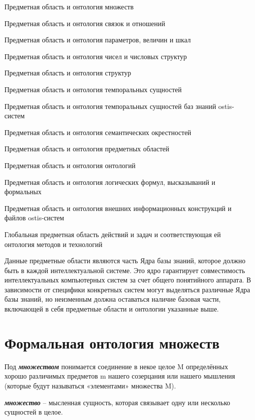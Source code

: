 \begin{textitemize}
\item Предметная область и онтология множеств
\item Предметная область и онтология связок и отношений
\item Предметная область и онтология параметров, величин и шкал
\item Предметная область и онтология чисел и числовых структур
\item Предметная область и онтология структур
\item Предметная область и онтология темпоральных сущностей
\item Предметная область и онтология темпоральных сущностей баз знаний ostis-систем
\item Предметная область и онтология семантических окрестностей
\item Предметная область и онтология предметных областей
\item Предметная область и онтология онтологий
\item Предметная область и онтология логических формул, высказываний и формальных %
\item Предметная область и онтология внешних информационных конструкций и файлов ostis-систем
\item Глобальная предметная область действий и задач и соответствующая ей онтология методов и технологий
\end{textitemize}

Данные предметные области являются часть Ядра базы знаний, которое должно быть в каждой интеллектуальной системе. Это ядро гарантирует совместимость интеллектуальных компьютерных систем за счет общего понятийного аппарата. В зависимости от специфики конкретных систем могут выделяться различные Ядра базы знаний, но неизменным должна оставаться наличие базовая части, включающей в себя предметные области и онтологии указанные выше.

\section{Формальная онтология множеств}
\label{sec_top_ontologies_set}

Под \textbf{\textit{множеством}} понимается соединение в некое целое M определённых хорошо различимых предметов m нашего созерцания или нашего мышления (которые будут называться «элементами» множества M). 

\textbf{\textit{множество}} – мысленная сущность, которая связывает одну или несколько сущностей в целое.

